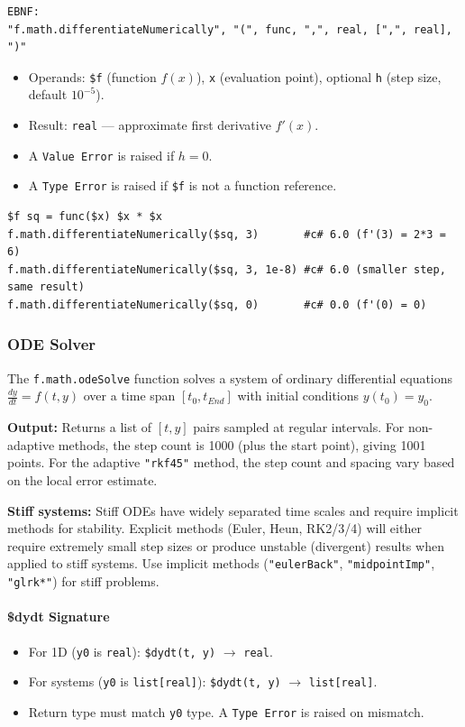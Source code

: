\begin{verbatim}
EBNF:
"f.math.differentiateNumerically", "(", func, ",", real, [",", real], ")"
\end{verbatim}
\begin{itemize}
\item Operands: \texttt{\$f} (function $f(x)$), \texttt{x} (evaluation point), optional \texttt{h} (step size, default $10^{-5}$).
\item Result: \texttt{real} --- approximate first derivative $f'(x)$.
\item A \texttt{Value Error} is raised if $h = 0$.
\item A \texttt{Type Error} is raised if \texttt{\$f} is not a function reference.
\end{itemize}

\begin{verbatim}
$f sq = func($x) $x * $x
f.math.differentiateNumerically($sq, 3)       #c# 6.0 (f'(3) = 2*3 = 6)
f.math.differentiateNumerically($sq, 3, 1e-8) #c# 6.0 (smaller step, same result)
f.math.differentiateNumerically($sq, 0)       #c# 0.0 (f'(0) = 0)
\end{verbatim}

\subsubsection{ODE Solver}
The \texttt{f.math.odeSolve} function solves a system of ordinary differential equations $\frac{dy}{dt} = f(t, y)$ over a time span $[t_0, t_{End}]$ with initial conditions $y(t_0) = y_0$.

\textbf{Output:} Returns a list of $[t, y]$ pairs sampled at regular intervals. For non-adaptive methods, the step count is 1000 (plus the start point), giving 1001 points. For the adaptive \texttt{"rkf45"} method, the step count and spacing vary based on the local error estimate.

\textbf{Stiff systems:} Stiff ODEs have widely separated time scales and require implicit methods for stability. Explicit methods (Euler, Heun, RK2/3/4) will either require extremely small step sizes or produce unstable (divergent) results when applied to stiff systems. Use implicit methods (\texttt{"eulerBack"}, \texttt{"midpointImp"}, \texttt{"glrk*"}) for stiff problems.

\paragraph{\$dydt Signature}
\begin{itemize}
\item For 1D (\texttt{y0} is \texttt{real}): \texttt{\$dydt(t, y)} $\rightarrow$ \texttt{real}.
\item For systems (\texttt{y0} is \texttt{list[real]}): \texttt{\$dydt(t, y)} $\rightarrow$ \texttt{list[real]}.
\item Return type must match \texttt{y0} type. A \texttt{Type Error} is raised on mismatch.
\end{itemize}

